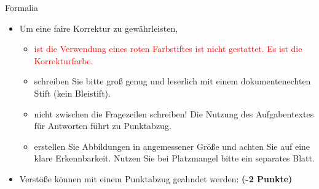 \documentclass[a4paper, 9pt]{scrartcl}\usepackage[]{graphicx}\usepackage[]{xcolor}
\begin{document}
\begin{graybox}{Formalia}
  \vspace{1Ex}
  \begin{itemize}
  \item Um eine faire Korrektur zu gewährleisten,
  \begin{itemize}
  \item \textcolor{red}{ist die Verwendung eines roten Farbstiftes ist nicht gestattet. Es ist die Korrekturfarbe.}
  \item schreiben Sie bitte groß genug und leserlich mit einem dokumentenechten Stift (kein Bleistift).
  \item nicht zwischen die Fragezeilen schreiben! Die Nutzung des Aufgabentextes für Antworten führt zu Punktabzug.
  \item erstellen Sie Abbildungen in angemessener Größe und achten Sie auf eine klare Erkennbarkeit. Nutzen Sie bei Platzmangel bitte ein separates Blatt.
  \end{itemize}
  \item Verstöße können mit einem Punktabzug geahndet werden:  \hfill \msquare\; \textbf{(-2 Punkte)}
  \end{itemize}
\end{graybox}
\vfill
\end{document}

